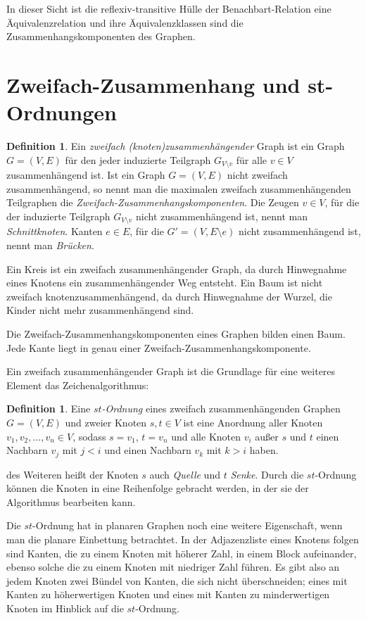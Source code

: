 \documentclass[a4paper]{scrreprt}
\theoremstyle{definition}
\newtheorem{definition}[satz]{Definition}
\begin{document}
In dieser Sicht ist die reflexiv-transitive Hülle der Benachbart-Relation eine Äquivalenzrelation und ihre Äquivalenzklassen sind die Zusammenhangskomponenten des Graphen. %


\section{Zweifach-Zusammenhang und st-Ordnungen}

\begin{definition}
  Ein \emph{zweifach (knoten)zusammenhängender} Graph ist ein Graph $G=(V, E)$ für den jeder induzierte Teilgraph $G_{V \setminus v}$ für alle $v \in V$ zusammenhängend ist.
  Ist ein Graph $G=(V, E)$  nicht zweifach zusammenhängend, so nennt man die maximalen zweifach zusammenhängenden Teilgraphen die \emph{Zweifach-Zusammenhangskomponenten}. Die Zeugen $v \in V$, für die der induzierte Teilgraph $G_{V \setminus v}$ nicht zusammenhängend ist, nennt man \emph{Schnittknoten}. Kanten $e \in E$, für die $G' = (V, E \setminus e)$ nicht zusammenhängend ist, nennt man \emph{Brücken}.
\end{definition}

Ein Kreis ist ein zweifach zusammenhängender Graph, da durch Hinwegnahme eines Knotens ein zusammenhängender Weg entsteht. Ein Baum ist nicht zweifach knotenzusammenhängend, da durch Hinwegnahme der Wurzel, die Kinder nicht mehr zusammenhängend sind.

Die Zweifach-Zusammenhangskomponenten eines Graphen bilden einen Baum. Jede Kante liegt in genau einer Zweifach-Zusammenhangskomponente.

Ein zweifach zusammenhängender Graph ist die Grundlage für eine weiteres Element das Zeichenalgorithmus:

\begin{definition}
  Eine \emph{$st$-Ordnung} eines zweifach zusammenhängenden Graphen $G = (V, E)$ und zweier Knoten $s, t \in V$ ist eine Anordnung aller Knoten $v_1, v_2, \dots, v_n \in V$, sodass $s = v_1$, $t = v_n$ und alle Knoten $v_i$ außer $s$ und $t$  einen Nachbarn $v_j$ mit $j < i$ und einen Nachbarn $v_k$ mit $k > i$ haben.
\end{definition}

des Weiteren heißt der Knoten $s$ auch \emph{Quelle} und $t$ \emph{Senke}. Durch die $st$-Ordnung können die Knoten in eine Reihenfolge gebracht werden, in der sie der Algorithmus bearbeiten kann.

Die $st$-Ordnung hat in planaren Graphen noch eine weitere Eigenschaft, wenn man die planare Einbettung betrachtet. In der Adjazenzliste eines Knotens folgen sind Kanten, die zu einem Knoten mit höherer Zahl, in einem Block aufeinander, ebenso solche die zu einem Knoten mit niedriger Zahl führen. Es gibt also an jedem Knoten zwei Bündel von Kanten, die sich nicht überschneiden; eines mit Kanten zu höherwertigen Knoten und eines mit Kanten zu minderwertigen Knoten im Hinblick auf die $st$-Ordnung.
\end{document}
